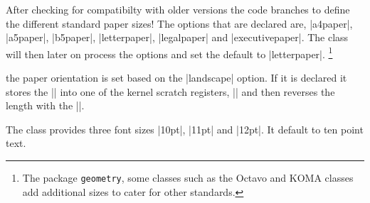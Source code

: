  After checking for compatibilty with older versions the code branches to define the different standard paper sizes! The options that are declared are, |a4paper|, |a5paper|, |b5paper|, |letterpaper|, |legalpaper| and  |executivepaper|. The class will then later on process the options and set the default to |letterpaper|. \footnote{The package \texttt{geometry}, some classes such as the Octavo and KOMA classes add additional sizes to cater for other standards.}

\begin{teX}
\if@compatibility\else
{}
   {\setlength\paperheight {297mm}%
    \setlength\paperwidth  {210mm}}
   {\setlength\paperheight {210mm}%
    \setlength\paperwidth  {148mm}}
   {\setlength\paperheight {250mm}%
    \setlength\paperwidth  {176mm}}
   {\setlength\paperheight {11in}%
    \setlength\paperwidth  {8.5in}}
   {\setlength\paperheight {14in}%
    \setlength\paperwidth  {8.5in}}
   {\setlength\paperheight {10.5in}%
    \setlength\paperwidth  {7.25in}}
\end{teX}

\begin{multicols}{2}
 the paper orientation is set based on the |landscape| option. If it is declared it stores the |\paperheight| into one of the \latex kernel scratch registers, |\@tempdima| and then reverses the length with the |\paperwidth|.
\end{multicols}

\begin{teX}
   {\setlength\@tempdima   {\paperheight}%
    \setlength\paperheight {\paperwidth}%
    \setlength\paperwidth  {\@tempdima}}
\fi
\end{teX}

\begin{multicols}{2}
 The class provides three font sizes |10pt|, |11pt| and |12pt|. It default to ten point text.
\end{multicols}

\begin{teX}
\if@compatibility
  \renewcommand\@ptsize{0}
\else
\DeclareOption{10pt}{\renewcommand\@ptsize{0}}
\fi
\DeclareOption{11pt}{\renewcommand\@ptsize{1}}
\DeclareOption{12pt}{\renewcommand\@ptsize{2}}
\end{teX}


